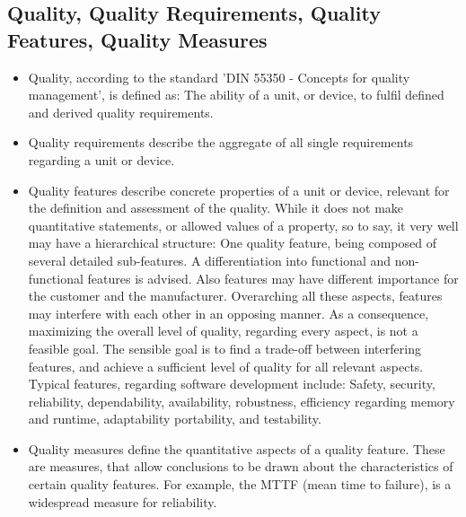 	\subsection{Quality, Quality Requirements, Quality Features, Quality Measures}
		\begin{itemize}
		\item Quality, according to the standard 'DIN 55350 - Concepts for quality management', is defined as: The ability of a unit, or device, to fulfil defined and derived quality requirements.
		\item Quality requirements describe the aggregate of all single requirements regarding a unit or device.
		\item Quality features describe concrete properties of a unit or device, relevant for the definition and assessment of the quality. While it does not make quantitative statements, or allowed values of a property, so to say, it very well may have a hierarchical structure: One quality feature, being composed of several detailed sub-features. A differentiation into functional and non-functional features is advised. Also features may have different importance for the customer and the manufacturer. Overarching all these aspects, features may interfere with each other in an opposing manner. As a consequence, maximizing the overall level of quality, regarding every aspect, is not a feasible goal. The sensible goal is to find a trade-off between interfering features, and achieve a sufficient level of quality for all relevant aspects. Typical features, regarding software development include: Safety, security, reliability, dependability, availability, robustness, efficiency regarding memory and runtime, adaptability portability, and testability.
		\item {Quality measures} define the quantitative aspects of a quality feature. These are measures, that allow conclusions to be drawn about the characteristics of certain quality features. For example, the MTTF (mean time to failure), is a widespread measure for reliability.
		\end{itemize}
	

